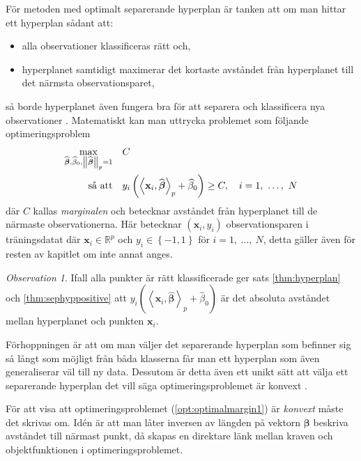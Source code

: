 \documentclass[a4paper, 12pt]{report}
\theoremstyle{definition}
\theoremstyle{remark}
\newtheorem*{rem}{Observation}
\newcommand{\bfbeta}{{\boldsymbol{\beta}}}
\newcommand{\bfx}{\mathbf{x}}
\newcommand{\llangle}{\left\langle}
\newcommand{\rrangle}{\right\rangle}
\newcommand{\inner}[2]{\llangle #1, #2 \rrangle}
\begin{document}
För metoden med optimalt separerande hyperplan är tanken att om man hittar ett hyperplan sådant att:
\begin{itemize}
	\item alla observationer klassificeras rätt och,
	\item hyperplanet samtidigt maximerar det kortaste avståndet från hyperplanet till det närmsta observationsparet,
\end{itemize}
så borde hyperplanet även fungera bra för att separera och klassificera nya observationer \cite{VapnikLerner1963}.
Matematiskt kan man uttrycka problemet som följande optimeringsproblem
\begin{equation}\label{opt:optimalmargin1}
\begin{aligned}
	 \operatornamewithlimits{max}_{\widehat{\bfbeta}, \widehat{\beta}_0, \left\|\widehat{\bfbeta}\right\|_p=1}& & &C\\
	 \text{så att}& & &y_i\left(\inner{\bfx_i}{\widehat{\bfbeta}}_p+\widehat{\beta}_0\right)\geq C,\quad i=1,~\dots,~N
\end{aligned}
\end{equation}
där $C$ kallas \emph{marginalen} och betecknar avståndet från hyperplanet till de närmaste observationerna. Här betecknar $\left(\bfx_i, y_i\right)$ observationsparen i träningsdatat där $\bfx_i\in\mathbb{R}^p$ och $y_i\in\left\{-1, 1 \right\}$ för $i=1,~\dots,~N$, detta gäller även för resten av kapitlet om inte annat anges.
\begin{rem}
	Ifall alla punkter är rätt klassificerade ger sats \ref{thm:hyperplan} och \ref{thm:sephyppositive} att $y_i\left(\inner{\bfx_i}{\widehat{\bfbeta}}_p+\widehat{\beta}_0\right)$ är det absoluta avståndet mellan hyperplanet och punkten $\mathbf{x}_i$.
\end{rem}

Förhoppningen är att om man väljer det separerande hyperplan som befinner sig så långt som möjligt från båda klasserna får man ett hyperplan som även generaliserar väl till ny data. Dessutom är detta även ett unikt sätt att välja ett separerande hyperplan det vill säga optimeringsproblemet är konvext \cite{ESL}. %

För att visa att optimeringsproblemet (\ref{opt:optimalmargin1}) är \textit{konvext} måste det skrivas om. Idén är att man låter inversen av längden på vektorn $\bfbeta$ beskriva avståndet till närmast punkt, då skapas en direktare länk mellan kraven och objektfunktionen i optimeringsproblemet.
\end{document}
